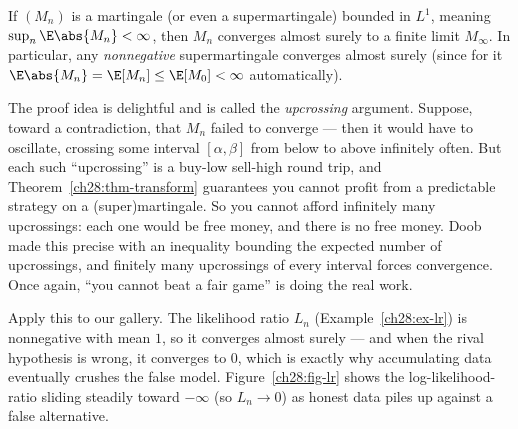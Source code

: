 \begin{theorem}
\label{ch28:thm-convergence}
If $(M_n)$ is a martingale (or even a supermartingale) bounded in $L^1$, meaning
$\sup_n \E\abs{M_n} < \infty$, then $M_n$ converges almost surely to a finite limit $M_\infty$. In
particular, any \emph{nonnegative} supermartingale converges almost surely (since for it
$\E\abs{M_n} = \E[M_n] \le \E[M_0] < \infty$ automatically).
\end{theorem}

\begin{intuitionbox}
The proof idea is delightful and is called the \emph{upcrossing} argument. Suppose, toward a
contradiction, that $M_n$ failed to converge --- then it would have to oscillate, crossing some
interval $[\alpha,\beta]$ from below to above infinitely often. But each such ``upcrossing'' is a
buy-low sell-high round trip, and Theorem~\ref{ch28:thm-transform} guarantees you cannot profit from a
predictable strategy on a (super)martingale. So you cannot afford infinitely many upcrossings: each one
would be free money, and there is no free money. Doob made this precise with an inequality bounding the
expected number of upcrossings, and finitely many upcrossings of every interval forces convergence.
Once again, ``you cannot beat a fair game'' is doing the real work.
\end{intuitionbox}

Apply this to our gallery. The likelihood ratio $L_n$ (Example~\ref{ch28:ex-lr}) is nonnegative with
mean $1$, so it converges almost surely --- and when the rival hypothesis is wrong, it converges to
$0$, which is exactly why accumulating data eventually crushes the false model.
Figure~\ref{ch28:fig-lr} shows the log-likelihood-ratio sliding steadily toward $-\infty$ (so
$L_n \to 0$) as honest data piles up against a false alternative.

